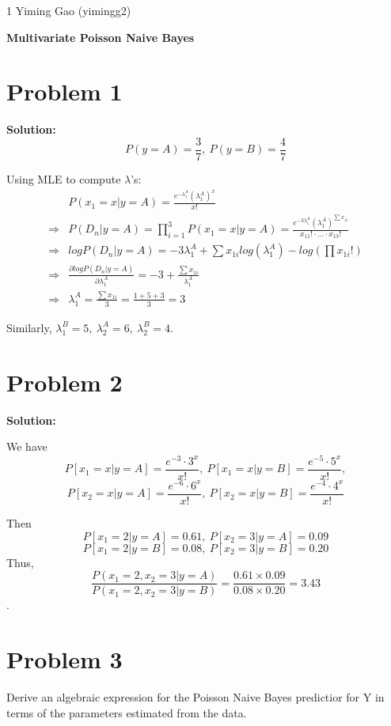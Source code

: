 \documentclass[11pt]{article}
\begin{document}
\homework
    {1}
    {Yiming Gao (yimingg2)}
    {}

\begin{center}
      \Large\textbf{Multivariate Poisson Naive Bayes}\\
\end{center}

\section*{Problem 1}
\textbf{Solution:} 
\[P(y = A) = \frac{3}{7},\ P(y=B) = \frac{4}{7}\]

Using MLE to compute $\lambda$'s: 
\begin{align*}
&P(x_1 = x|y = A)= \frac{e^{-\lambda^A_1}(\lambda^A_1)^x}{x!} \\[0.8em]
\Longrightarrow &P(D_n| y = A) = \prod_{i=1}^{3} P(x_1 = x|y = A) = \frac{e^{-3\lambda^A_1}(\lambda^A_1)^{\sum x_{1i}}}{x_{11}!\cdot ...\cdot x_{13}!}\\[0.8em]
\Longrightarrow &logP(D_n| y = A) = -3\lambda^A_1 + \sum x_{1i}log(\lambda^A_1)-log(\prod x_{1i}!)\\[0.8em]
\Longrightarrow &\frac{\partial logP(D_n| y = A)}{\partial \lambda^A_1} = -3 + \frac{\sum x_{1i}}{\lambda^A_1}\\[0.8em]
\Longrightarrow & \lambda^A_1 = \frac{\sum x_{1i}}{3} = \frac{1+5+3}{3} = 3
\end{align*}

Similarly, $\lambda^B_1 = 5, \ \lambda^A_2 = 6, \ \lambda^B_2 = 4$.

\section*{Problem 2}
\textbf{Solution:} 

We have 
\[P[x_1 = x|y = A] = \frac{e^{-3}\cdot 3^x}{x!},\ 
P[x_1 = x|y = B] = \frac{e^{-5}\cdot 5^x}{x!},\]
\[P[x_2 = x|y = A] = \frac{e^{-6}\cdot 6^x}{x!},\ 
P[x_2 = x|y = B] = \frac{e^{-4}\cdot 4^x}{x!}\]

Then
\[P[x_1 = 2|y = A] = 0.61, \ P[x_2 = 3|y = A] = 0.09\]
\[P[x_1 = 2|y = B] = 0.08, \ P[x_2 = 3|y = B] = 0.20\]
Thus, $$\frac{P(x_1 = 2, x_2 = 3|y = A)}{P(x_1 = 2, x_2 = 3|y = B)} = \frac{0.61\times 0.09}{0.08\times 0.20} = 3.43$$.


\section*{Problem 3}
Derive an algebraic expression for the Poisson Naive Bayes predictior for Y in terms of the parameters estimated from the data.
\end{document}

